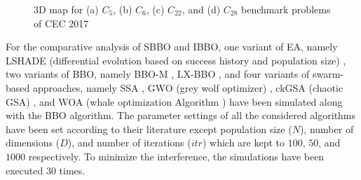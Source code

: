 \begin{figure}
    \centering
{} 
 \caption[3D map for multi-modal and composition based benchmark problems]{\fontsize{10pt}{12pt}\selectfont  3D map for (a) $C_5$, (b) $C_6$,  (c) $C_{22}$, and (d) $C_{28}$  benchmark problems of CEC 2017 \cite{wu2016}}
\label{fig:fplot}
\end{figure}

For the comparative analysis of SBBO and IBBO, one variant of EA, namely LSHADE (differential evolution based on success history and population size) \cite{Mohamed2017}, two variants of BBO, namely BBO-M \cite{Niu2014}, LX-BBO \cite{Garg2016}, and four variants of swarm-based approaches, namely  SSA \cite{Mirjalili2017},  GWO (grey wolf optimizer) \cite{mirjalili2014}, ckGSA (chaotic GSA) \cite{mittal2016}, and WOA (whale optimization Algorithm ) \cite{mirjalili2016} have been simulated along with the BBO algorithm. The parameter settings of all the considered algorithms have been set according to their literature except population size ($N$),  number of dimensions ($D$), and  number of iterations ($itr$) which are kept to $100$, $50$, and $1000$ respectively. To minimize the interference, the simulations have been executed $30$ times.  


